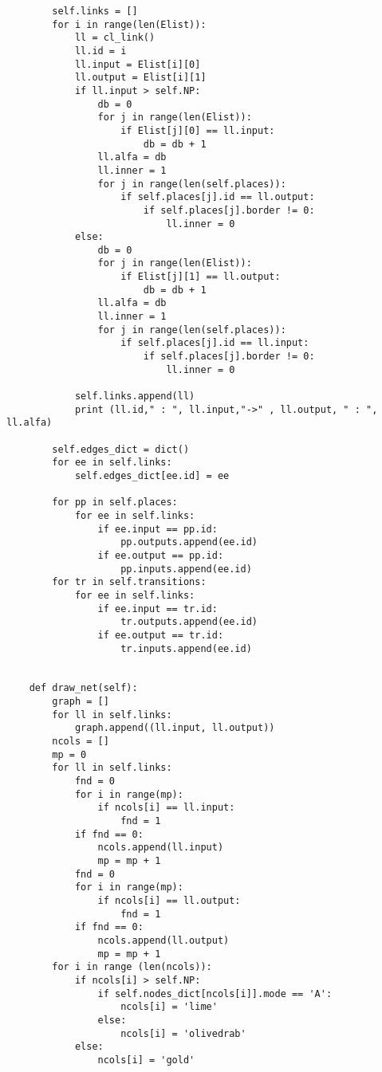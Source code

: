 \begin{verbatim}
        self.links = []
        for i in range(len(Elist)):
            ll = cl_link()
            ll.id = i
            ll.input = Elist[i][0]
            ll.output = Elist[i][1]
            if ll.input > self.NP:
                db = 0
                for j in range(len(Elist)):
                    if Elist[j][0] == ll.input:
                        db = db + 1
                ll.alfa = db
                ll.inner = 1
                for j in range(len(self.places)):
                    if self.places[j].id == ll.output:
                        if self.places[j].border != 0:
                            ll.inner = 0
            else:
                db = 0
                for j in range(len(Elist)):
                    if Elist[j][1] == ll.output:
                        db = db + 1
                ll.alfa = db
                ll.inner = 1
                for j in range(len(self.places)):
                    if self.places[j].id == ll.input:
                        if self.places[j].border != 0:
                            ll.inner = 0
            
            self.links.append(ll)
            print (ll.id," : ", ll.input,"->" , ll.output, " : ", ll.alfa)
        
        self.edges_dict = dict()
        for ee in self.links:
            self.edges_dict[ee.id] = ee
        
        for pp in self.places:
            for ee in self.links:
                if ee.input == pp.id:
                    pp.outputs.append(ee.id)
                if ee.output == pp.id:
                    pp.inputs.append(ee.id)
        for tr in self.transitions:
            for ee in self.links:
                if ee.input == tr.id:
                    tr.outputs.append(ee.id)
                if ee.output == tr.id:
                    tr.inputs.append(ee.id)
    
    
    def draw_net(self):
        graph = []
        for ll in self.links:
            graph.append((ll.input, ll.output))
        ncols = []
        mp = 0
        for ll in self.links:
            fnd = 0
            for i in range(mp):
                if ncols[i] == ll.input:
                    fnd = 1
            if fnd == 0:
                ncols.append(ll.input)
                mp = mp + 1
            fnd = 0
            for i in range(mp):
                if ncols[i] == ll.output:
                    fnd = 1
            if fnd == 0:
                ncols.append(ll.output)
                mp = mp + 1
        for i in range (len(ncols)):
            if ncols[i] > self.NP:
                if self.nodes_dict[ncols[i]].mode == 'A':
                    ncols[i] = 'lime'
                else:
                    ncols[i] = 'olivedrab'
            else:
                ncols[i] = 'gold'
            

\end{verbatim}
